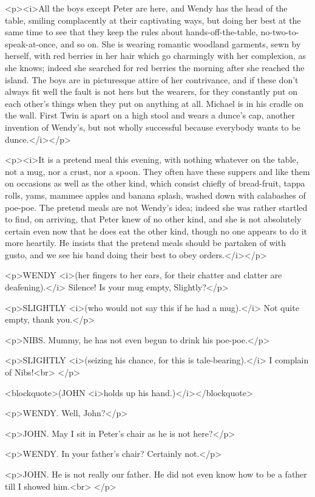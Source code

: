 <p><i>All the boys except Peter are here, and Wendy has the head of
the table, smiling complacently at their captivating ways, but doing
her best at the same time to see that they keep the rules about
hands-off-the-table, no-two-to-speak-at-once, and so on. She is
wearing romantic woodland garments, sewn by herself, with red berries
in her hair which go charmingly with her complexion, as she knows;
indeed she searched for red berries the morning after she reached the
island. The boys are in picturesque attire of her contrivance, and if
these don't always fit well the fault is not hers but the wearers,
for they constantly put on each other's things when they put on
anything at all. Michael is in his cradle on the wall. First Twin is
apart on a high stool and wears a dunce's cap, another invention of
Wendy's, but not wholly successful because everybody wants to be
dunce.</i></p>

<p><i>It is a pretend meal this evening, with nothing whatever on the
table, not a mug, nor a crust, nor a spoon. They often have these
suppers and like them on occasions as well as the other kind, which
consist chiefly of bread-fruit, tappa rolls, yams, mammee apples and
banana splash, washed down with calabashes of poe-poe. The pretend
meals are not Wendy's idea; indeed she was rather startled to find,
on arriving, that Peter knew of no other kind, and she is not
absolutely certain even now that he does eat the other kind, though
no one appears to do it more heartily. He insists that the pretend
meals should be partaken of with gusto, and we see his band doing
their best to obey orders.</i></p>

<p>WENDY <i>(her fingers to her ears, for their chatter and clatter
are deafening).</i> Silence! Is your mug empty, Slightly?</p>

<p>SLIGHTLY <i>(who would not say this if he had a mug).</i> Not
quite empty, thank you.</p>

<p>NIBS. Mummy, he has not even begun to drink his poe-poe.</p>

<p>SLIGHTLY <i>(seizing his chance, for this is tale-bearing).</i> I
complain of Nibs!<br>
</p>

<blockquote>(JOHN <i>holds up his hand.)</i></blockquote>

<p>WENDY. Well, John?</p>

<p>JOHN. May I sit in Peter's chair as he is not here?</p>

<p>WENDY. In your father's chair? Certainly not.</p>

<p>JOHN. He is not really our father. He did not even know how to be
a father till I showed him.<br>
</p>

